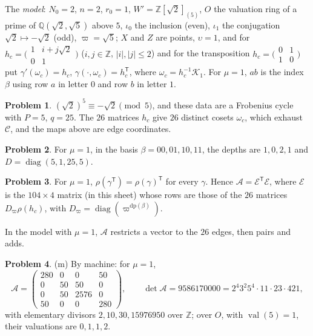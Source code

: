 \documentclass[reqno]{amsart}
\numberwithin{equation}{section}
\theoremstyle{plain}
\theoremstyle{definition}
\newtheorem{problem}{Problem}[section]
\theoremstyle{remark}
\newcommand{\Z}{\mathbb{Z}}
\newcommand{\Q}{\mathbb{Q}}
\newcommand{\Cc}{\mathcal C}
\newcommand{\Kc}{\mathcal K}
\newcommand{\Ac}{\mathcal A}
\newcommand{\Ec}{\mathcal E}
\newcommand{\dpt}{\mathrm{dp}}
\newcommand{\val}{\operatorname{val}}
\begin{document}
The \emph{model}: \(N_0 = 2\), \(n = 2\), \(r_0 = 1\), \(W' = \Z[\sqrt2]_{(5)}\), \(O\) the valuation ring of a prime of \(\Q(\sqrt2, \sqrt5)\) above \(5\), \(\iota_0\) the inclusion (even), \(\iota_1\) the conjugation \(\sqrt2 \mapsto -\sqrt2\) (odd), \(\varpi = \sqrt5\); \(X\) and \(Z\) are points, \(\upsilon = 1\), and for \(h_c = \bigl(\begin{smallmatrix}1 & i + j\sqrt2\\ 0 & 1\end{smallmatrix}\bigr)\) (\(i, j \in \Z\), \(\lvert i\rvert, \lvert j\rvert \le 2\)) and for the transposition \(h_c = \bigl(\begin{smallmatrix}0&1\\1&0\end{smallmatrix}\bigr)\) put \(\gamma'(\omega_c) = h_c\), \(\gamma(\cdot, \omega_c) = h_c^{\mathsf T}\), where \(\omega_c = h_c^{-1}\Kc_1\).  For \(\mu = 1\), \(ab\) is the index \(\beta\) using row \(a\) in letter \(0\) and row \(b\) in letter \(1\).

\begin{problem}\label{pr:cycle-model}
\((\sqrt2)^5 \equiv -\sqrt2 \pmod 5\), and these data are a Frobenius cycle with \(P = 5\), \(q = 25\).  The \(26\) matrices \(h_c\) give \(26\) distinct cosets \(\omega_c\), which exhaust \(\Cc\), and the maps above are edge coordinates.
\end{problem}

\begin{problem}\label{pr:depths}
For \(\mu = 1\), in the basis \(\beta = 00, 01, 10, 11\), the depths are \(1, 0, 2, 1\) and \(D = \operatorname{diag}(5, 1, 25, 5)\).
\end{problem}

\begin{problem}\label{pr:factor}
For \(\mu = 1\), \(\rho(\gamma^{\mathsf T}) = \rho(\gamma)^{\mathsf T}\) for every \(\gamma\).  Hence \(\Ac = \Ec^{\mathsf T}\Ec\), where \(\Ec\) is the \(104 \times 4\) matrix (in this sheet) whose rows are those of the \(26\) matrices \(D_\varpi\rho(h_c)\), with \(D_\varpi = \operatorname{diag}(\varpi^{\dpt(\beta)})\).
\end{problem}

In the model with \(\mu = 1\), \(\Ac\) restricts a vector to the \(26\) edges, then pairs and adds.

\begin{problem}\label{pr:edge-matrix}
(m) By machine: for \(\mu = 1\),
\[
  \Ac = \begin{pmatrix} 280 & 0 & 0 & 50\\ 0 & 50 & 50 & 0\\ 0 & 50 & 2576 & 0\\ 50 & 0 & 0 & 280 \end{pmatrix}, \qquad \det\Ac = 9586170000 = 2^4 3^2 5^4 \cdot 11 \cdot 23 \cdot 421,
\]
with elementary divisors \(2, 10, 30, 15976950\) over \(\Z\); over \(O\), with \(\val(5) = 1\), their valuations are \(0, 1, 1, 2\).
\end{problem}
\end{document}
